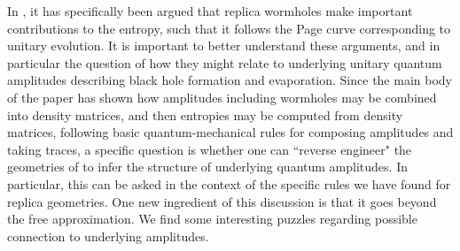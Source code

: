 \documentclass[11pt]{article}
\numberwithin{equation}{section}
\begin{document}
In \cite{Penington:2019kki, Almheiri:2019qdq}, it has specifically been argued that replica wormholes make important contributions to the entropy, such that it follows the Page curve corresponding to unitary evolution.  It is important to better understand these arguments, and in particular the question of how they might relate  to underlying unitary quantum amplitudes describing black hole formation and evaporation.  Since the main body of the paper has shown how amplitudes including wormholes may be combined into density matrices, and then entropies may be computed from density matrices, following basic quantum-mechanical rules for composing amplitudes and taking traces, a specific question is whether one can ``reverse engineer" the geometries of 
\cite{Penington:2019kki, Almheiri:2019qdq} to infer the structure of underlying quantum amplitudes.  In particular, this can be asked in the context of the specific rules we have found for replica geometries.  One new ingredient of this discussion is that it goes beyond the free approximation.  We find some interesting puzzles regarding possible connection to underlying amplitudes.
\end{document}
